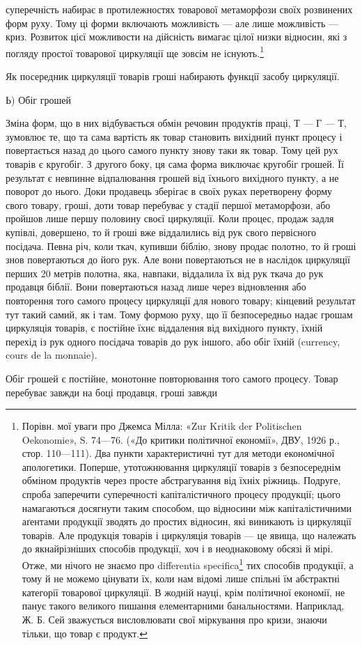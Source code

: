 \parcont{}  %
суперечність набирає в протилежностях товарової метаморфози
своїх розвинених форм руху. Тому ці форми включають можливість
— але лише можливість — криз. Розвиток цієї можливости
на дійсність вимагає цілої низки відносин, які з погляду простої
товарової циркуляції ще зовсім не існують.\footnote{
Порівн. мої уваги про Джемса Мілла: «Zur Kritik der Politischen
Oekonomie», S. 74—76. («До критики політичної економії», ДВУ, 1926 р.,
стор. 110—111). Два пункти характеристичні тут для методи економічної
апологетики. Поперше, утотожнювання циркуляції товарів з безпосереднім
обміном продуктів через просте абстрагування від їхніх ріжниць.
Подруге, спроба заперечити суперечності капіталістичного процесу продукції;
цього намагаються досягнути таким способом, що відносини між
капіталістичними аґентами продукції зводять до простих відносин, які
виникають із циркуляції товарів. Але продукція товарів і циркуляція
товарів — це явища, що належать до якнайрізніших способів продукції,
хоч і в неоднаковому обсязі й мірі. Отже, ми нічого не знаємо про differentia
specifica\footnote*{
— характеристичні особливості. \emph{Ред.}
} тих способів продукції, а тому й не можемо цінувати їх,
коли нам відомі лише спільні їм абстрактні категорії товарової циркуляції.
В жодній науці, крім політичної економії, не панує такого великого
пишання елементарними банальностями. Наприклад, Ж. Б. Сей зважується
висловлювати свої міркування про кризи, знаючи тільки, що товар
є продукт.
}

Як посередник циркуляції товарів гроші набирають функції
засобу циркуляції.

Ь) Обіг грошей

Зміна форм, що в них відбувається обмін речовин продуктів
праці, Т — Г — Т, зумовлює те, що та сама вартість як товар
становить вихідний пункт процесу і повертається назад до цього
самого пункту знову таки як товар. Тому цей рух товарів є кругобіг.
З другого боку, ця сама форма виключає кругобіг грошей.
Її результат є невпинне відпалювання грошей від їхнього вихідного
пункту, а не поворот до нього. Доки продавець зберігає
в своїх руках перетворену форму свого товару, гроші, доти
товар перебуває у стадії першої метаморфози, або пройшов лише
першу половину своєї циркуляції. Коли процес, продаж задля
купівлі, довершено, то й гроші вже віддалились від рук свого
первісного посідача. Певна річ, коли ткач, купивши біблію,
знову продає полотно, то й гроші знов повертаються до його рук.
Але вони повертаються не в наслідок циркуляції перших
20 метрів полотна, яка, навпаки, віддалила їх від рук ткача
до рук продавця біблії. Вони повертаються назад лише через
відновлення або повторення того самого процесу циркуляції
для нового товару; кінцевий результат тут такий самий, як
і там. Тому формою руху, що її безпосередньо надає грошам
циркуляція товарів, є постійне їхнє віддалення від вихідного
пункту, їхній перехід із рук одного посідача товарів до рук
іншого, або обіг їхній (currency, cours de la monnaie).

Обіг грошей є постійне, монотонне повторювання того самого
процесу. Товар перебуває завжди на боці продавця, гроші завжди
\parbreak{}  %
